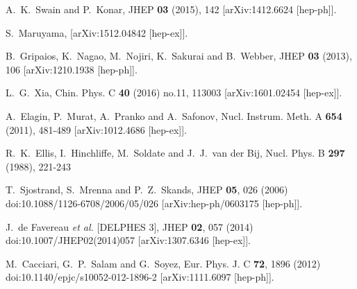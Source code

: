 \documentclass[pdftex,twocolumn,epjc3]{svjour3}          %
\begin{document}
\begin{thebibliography}{9}
A.~K.~Swain and P.~Konar,
JHEP \textbf{03} (2015), 142
[arXiv:1412.6624 [hep-ph]].


S.~Maruyama,
[arXiv:1512.04842 [hep-ex]].

B.~Gripaios, K.~Nagao, M.~Nojiri, K.~Sakurai and B.~Webber,
JHEP \textbf{03} (2013), 106
[arXiv:1210.1938 [hep-ph]].


L.~G.~Xia,
Chin. Phys. C \textbf{40} (2016) no.11, 113003
[arXiv:1601.02454 [hep-ex]].


A.~Elagin, P.~Murat, A.~Pranko and A.~Safonov,
Nucl. Instrum. Meth. A \textbf{654} (2011), 481-489
[arXiv:1012.4686 [hep-ex]].


R.~K.~Ellis, I.~Hinchliffe, M.~Soldate and J.~J.~van der Bij,
Nucl. Phys. B \textbf{297} (1988), 221-243

T.~Sjostrand, S.~Mrenna and P.~Z.~Skands,
JHEP \textbf{05}, 026 (2006)
doi:10.1088/1126-6708/2006/05/026
[arXiv:hep-ph/0603175 [hep-ph]].

J.~de Favereau \textit{et al.} [DELPHES 3],
JHEP \textbf{02}, 057 (2014)
doi:10.1007/JHEP02(2014)057
[arXiv:1307.6346 [hep-ex]].

M.~Cacciari, G.~P.~Salam and G.~Soyez,
Eur. Phys. J. C \textbf{72}, 1896 (2012)
doi:10.1140/epjc/s10052-012-1896-2
[arXiv:1111.6097 [hep-ph]].

\end{thebibliography}
\end{document}
